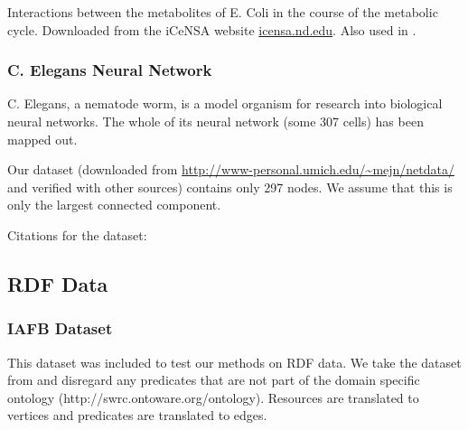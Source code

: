 \documentclass{article}
\theoremstyle{definition}
\begin{document}
Interactions between the metabolites of E. Coli in the course of the metabolic cycle. Downloaded from the iCeNSA website \url{icensa.nd.edu}. Also used in \cite{song2005self}.

\subsubsection*{C. Elegans Neural Network}

C. Elegans, a nematode worm, is a model organism for research into biological neural networks. The whole of its neural network (some 307 cells) has been mapped out.

Our dataset (downloaded from \url{http://www-personal.umich.edu/~mejn/netdata/} and verified with other sources) contains only 297 nodes. We assume that this is only the largest connected component.

Citations for the dataset: \cite{watts1998collective,white1986structure}

\subsection*{RDF Data}
\subsubsection*{IAFB Dataset}

This dataset was included to test our methods on RDF data. We take the dataset from \cite{bloehdorn2007kernel} and disregard any predicates that are not part of the domain specific ontology (http://swrc.ontoware.org/ontology). Resources are translated to vertices and predicates are translated to edges.
\end{document}
